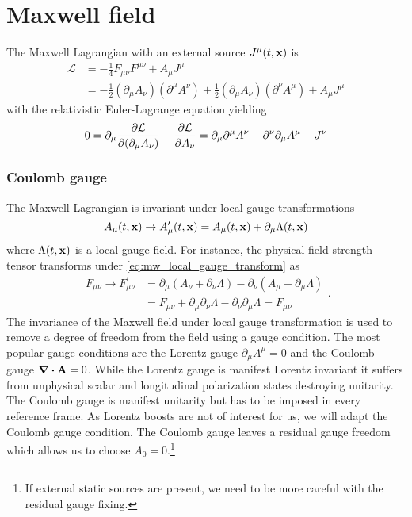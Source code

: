 \section{Maxwell field}

The Maxwell Lagrangian with an external source $J^\mu(t,\vb{x})$ is~\cite[p.~339]{Srednicki2007}
\begin{equation}
	\begin{split}
		\mathcal{L}
		&=
		-
		\frac{1}{4}
		F_{\mu\nu}
		F^{\mu\nu}
		+
		A_\mu J^\mu
		\\
		&=
		-
		\frac{1}{2}
		(\partial_\mu A_\nu)
		(\partial^\mu A^\nu)
		+
		\frac{1}{2}
		(\partial_\mu A_\nu)
		(\partial^\nu A^\mu)
		+
		A_\mu J^\mu
	\end{split}
	\label{eq:mw_lagrangian}
\end{equation}
with the relativistic Euler-Lagrange equation yielding
\begin{equation}
	0
	=
	\partial_\mu\pdv{\mathcal{L}}{(\partial_\mu A_\nu)}
	-
	\pdv{\mathcal{L}}{A_\nu}
	=
	\partial_\mu\partial^\mu A^\nu
	-
	\partial^\nu\partial_\mu A^\mu
	-
	J^\nu	
	\label{eq:mw_eom}	
\end{equation}

\subsubsection{Coulomb gauge}

The Maxwell Lagrangian is invariant under local gauge transformations
\begin{equation}
	A_\mu(t,\vb{x})
	\to
	A_\mu^\prime(t,\vb{x})
	=
	A_\mu(t,\vb{x})
	+
	\partial_\mu\Lambda(t,\vb{x})
	\label{eq:mw_local_gauge_transform}
\end{equation}
where $\Lambda(t,\vb{x})$ is a local gauge field.
For instance, the physical field-strength tensor transforms under \cref{eq:mw_local_gauge_transform} as
\begin{equation}
	\begin{split}
		F_{\mu\nu}
		\to
		F_{\mu\nu}^\prime
		&=
		\partial_\mu\left(A_\nu+\partial_\nu\Lambda\right)
		-
		\partial_\nu\left(A_\mu+\partial_\mu\Lambda\right)
		\\
		&=
		F_{\mu\nu}
		+
		\partial_\mu\partial_\nu\Lambda
		-
		\partial_\nu\partial_\mu\Lambda
		=
		F_{\mu\nu}
	\end{split}
	\label{eq:mw_field_strength_gauge_transform}.
\end{equation}
The invariance of the Maxwell field under local gauge transformation is used to remove a degree of freedom from the field using a gauge condition.
The most popular gauge conditions are the Lorentz gauge $\partial_\mu A^\mu=0$ and the Coulomb gauge $\div\vb{A}=0$.
While the Lorentz gauge is manifest Lorentz invariant it suffers from unphysical scalar and longitudinal polarization states destroying unitarity.
The Coulomb gauge is manifest unitarity but has to be imposed in every reference frame.
As Lorentz boosts are not of interest for us, we will adapt the Coulomb gauge condition.
The Coulomb gauge leaves a residual gauge freedom which allows us to choose $A_0=0$.\footnote{If external static sources are present, we need to be more careful with the residual gauge fixing.}

